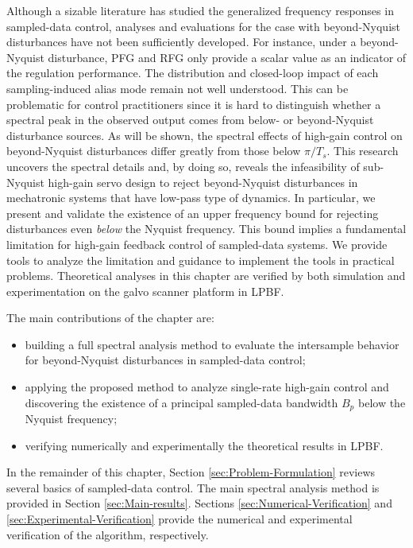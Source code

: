 \documentclass [11pt, proquest] {uwthesis}[2020/02/24]
\begin{document}
Although a sizable literature has studied the generalized frequency
responses in sampled-data control, analyses and evaluations for the
case with beyond-Nyquist disturbances have not been sufficiently developed.
For instance, under a beyond-Nyquist disturbance, PFG and RFG only
provide a scalar value as an indicator of the regulation performance.
The distribution and closed-loop impact of each sampling-induced
alias mode remain not well understood. This can be problematic for
control practitioners since it is hard to distinguish whether a spectral
peak in the observed output comes from below- or beyond-Nyquist disturbance
sources. As will be shown, the spectral effects of high-gain control
on beyond-Nyquist disturbances differ greatly from those below $\pi/T_{s}$.
This research uncovers the spectral details and, by doing so, reveals
the infeasibility of sub-Nyquist high-gain servo design to reject
beyond-Nyquist disturbances in mechatronic systems that have low-pass
type of dynamics. In particular, we present and validate the existence
of an upper frequency bound for rejecting disturbances even \emph{below}
the Nyquist frequency. This bound implies a fundamental limitation
for high-gain feedback control of sampled-data systems. We provide
tools to analyze the limitation and guidance to implement the tools
in practical problems. Theoretical analyses in this chapter are verified
by both simulation and experimentation on the galvo scanner platform
in LPBF.

The main contributions of the chapter are:
\begin{itemize}
\item building a full spectral analysis method to evaluate the intersample
behavior for beyond-Nyquist disturbances in sampled-data control;
\item applying the proposed method to analyze single-rate high-gain control
and discovering the existence of a principal sampled-data bandwidth
$B_{p}$ below the Nyquist frequency;
\item verifying numerically and experimentally the theoretical results in
LPBF.
\end{itemize}

In the remainder of this chapter,
Section \ref{sec:Problem-Formulation} reviews several basics of sampled-data
control. The main spectral analysis method is provided in Section
\ref{sec:Main-results}. Sections \ref{sec:Numerical-Verification}
and \ref{sec:Experimental-Verification} provide the numerical and
experimental verification of the algorithm, respectively. 
\end{document}
